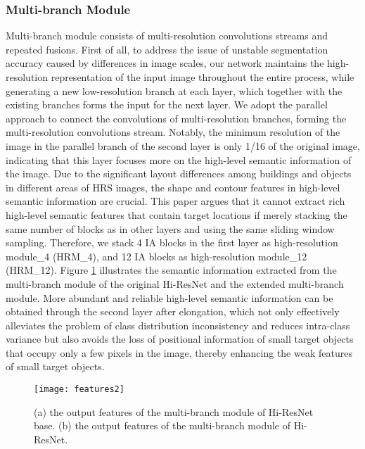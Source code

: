 \documentclass[journal]{IEEEtran}
\begin{document}
\subsubsection{Multi-branch Module}
Multi-branch module consists of multi-resolution convolutions streams and repeated fusions. First of all, to address the issue of unstable segmentation accuracy caused by differences in image scales, our network maintains the high-resolution representation of the input image throughout the entire process, while generating a new low-resolution branch at each layer, which together with the existing branches forms the input for the next layer. We adopt the parallel approach to connect the convolutions of multi-resolution branches, forming the multi-resolution convolutions stream. Notably, the minimum resolution of the image in the parallel branch of the second layer is only 1/16 of the original image, indicating that this layer focuses more on the high-level semantic information of the image. Due to the significant layout differences among buildings and objects in different areas of HRS images, the shape and contour features in high-level semantic information are crucial. This paper argues that it cannot extract rich high-level semantic features that contain target locations if merely stacking the same number of blocks as in other layers and using the same sliding window sampling. Therefore, we stack 4 IA blocks in the first layer as high-resolution module\_4 (HRM\_4), and 12 IA blocks as high-resolution module\_12 (HRM\_12). Figure \ref{fig:features2} illustrates the semantic information extracted from the multi-branch module of the original Hi-ResNet and the extended multi-branch module. More abundant and reliable high-level semantic information can be obtained through the second layer after elongation, which not only effectively alleviates the problem of class distribution inconsistency and reduces intra-class variance but also avoids the loss of positional information of small target objects that occupy only a few pixels in the image, thereby enhancing the weak features of small target objects.

\begin{figure}[!ht]
    \centering
    \texttt{[image: features2]}
    \caption{(a) the output features of the multi-branch module of Hi-ResNet base. (b) the output features of the multi-branch module of Hi-ResNet.}
    \label{fig:features2}
\end{figure}
\end{document}
